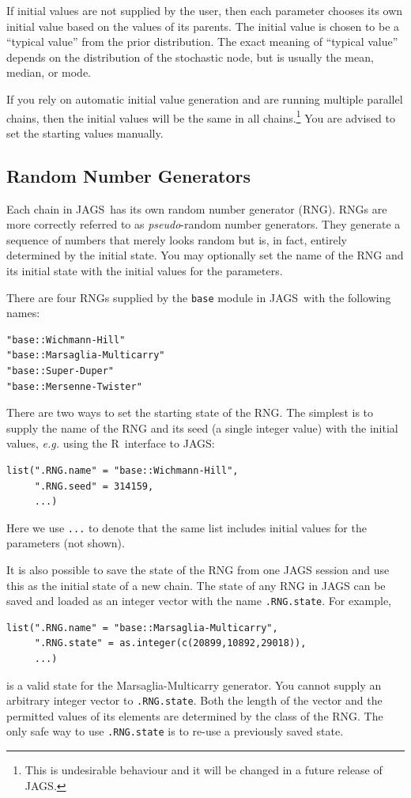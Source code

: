 \documentclass[11pt, a4paper, titlepage]{report}
\newcommand{\JAGS}{\textsf{JAGS}}
\newcommand{\R}{\textsf{R}}
\begin{document}
If initial values are not supplied by the user, then each parameter
chooses its own initial value based on the values of its parents.  The
initial value is chosen to be a ``typical value'' from the prior
distribution. The exact meaning of ``typical value'' depends on the
distribution of the stochastic node, but is usually the mean, median,
or mode.

If you rely on automatic initial value generation and are running
multiple parallel chains, then the initial values will be the same in
all chains.\footnote{This is undesirable behaviour and it will be changed in a
future release of \JAGS.} You are advised to set the starting values
manually.

\subsection{Random Number Generators}
\label{section:rngs}

Each chain in \JAGS\ has its own random number generator (RNG). RNGs
are more correctly referred to as {\em pseudo}-random number
generators. They generate a sequence of numbers that merely looks
random but is, in fact, entirely determined by the initial state.  You
may optionally set the name of the RNG and its initial state with the
initial values for the parameters.

There are four RNGs supplied by the \texttt{base} module in \JAGS\
with the following names:
\begin{verbatim}
"base::Wichmann-Hill"
"base::Marsaglia-Multicarry"
"base::Super-Duper"
"base::Mersenne-Twister"
\end{verbatim}

There are two ways to set the starting state of the RNG. The simplest
is to supply the name of the RNG and its seed (a single integer value)
with the initial values, {\em e.g.} using the \R\ interface to \JAGS:
\begin{verbatim}
list(".RNG.name" = "base::Wichmann-Hill",
     ".RNG.seed" = 314159,
     ...)
\end{verbatim}
Here we use \texttt{...} to denote that the same list includes initial
values for the parameters (not shown).

It is also possible to save the state of the RNG from one JAGS session
and use this as the initial state of a new chain. The state of any RNG
in JAGS can be saved and loaded as an integer vector with the name
\texttt{.RNG.state}. For example,
\begin{verbatim}
list(".RNG.name" = "base::Marsaglia-Multicarry",
     ".RNG.state" = as.integer(c(20899,10892,29018)),
     ...)
\end{verbatim}
is a valid state for the Marsaglia-Multicarry generator.  You cannot
supply an arbitrary integer vector to \texttt{.RNG.state}. Both the
length of the vector and the permitted values of its elements are
determined by the class of the RNG. The only safe way to use
\texttt{.RNG.state} is to re-use a previously saved state.
\end{document}
